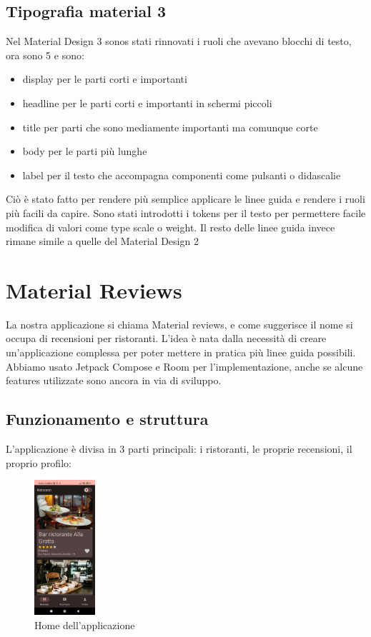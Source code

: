 \documentclass[12pt, a4paper]{report}
\begin{document}
	\section{Tipografia material 3}
		Nel Material Design 3 sonos stati rinnovati i ruoli che avevano blocchi di testo, ora sono 5 e sono:
		\begin{itemize}
			\item display per le parti corti e importanti
			\item headline per le parti corti e importanti in schermi piccoli
			\item title	per parti che sono mediamente importanti ma comunque corte
			\item body per le parti più lunghe
			\item label per il testo che accompagna componenti come pulsanti o didascalie
		\end{itemize}
		Ciò è stato fatto per rendere più semplice applicare le linee guida e rendere i ruoli più facili da capire.
		Sono stati introdotti i tokens per il testo per permettere facile modifica di valori come type scale o weight.
		Il resto delle linee guida invece rimane simile a quelle del Material Design 2
	
\chapter{Material Reviews}
	La nostra applicazione si chiama Material reviews, e come suggerisce il nome si occupa di recensioni per ristoranti.
	L'idea è nata dalla necessità di creare un'applicazione complessa per poter mettere in pratica più linee guida possibili.
	Abbiamo usato Jetpack Compose \cite{compose} e Room\cite{room} per l'implementazione, anche se alcune features utilizzate sono ancora in via di sviluppo.
	\section{Funzionamento e struttura}
	L'applicazione è divisa in 3 parti principali: i ristoranti, le proprie recensioni, il proprio profilo:


	\begin{figure}[h]
		\centering
		\includegraphics[width=0.2\textwidth]{screenHome.jpg} 
	  \caption{Home dell'applicazione}
		
	\end{figure}
\end{document}
